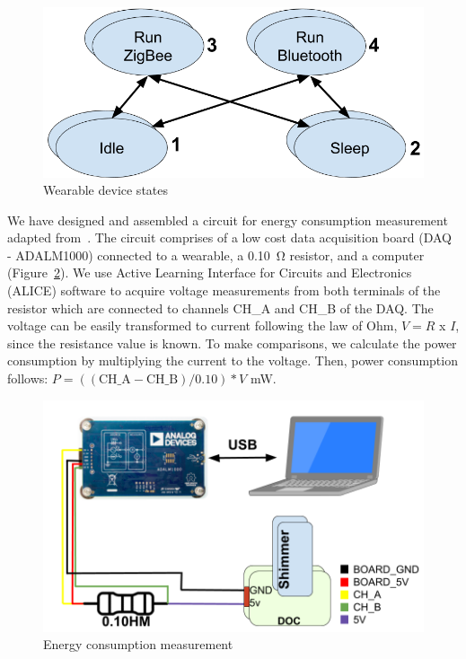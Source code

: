 \documentclass[journal]{IEEEtran}
\begin{document}
\begin{figure}[tbh]
  \centering
  \includegraphics[scale=0.19]{Figures/estados.png}
  \caption{Wearable device states}
  \label{fig:states}
  \vspace{-0.5cm}
\end{figure}

We have designed and assembled a circuit for energy consumption measurement adapted from~\cite{bessa2017jetsonleap}. The circuit comprises of a low cost data acquisition board (DAQ - ADALM1000) connected to a wearable, a 0.10~\si{\ohm} resistor, and a computer (Figure~\ref{fig:circuit}). We use Active Learning Interface for Circuits and Electronics (ALICE) software to acquire voltage measurements from both terminals of the resistor which are connected to channels CH\_A and CH\_B of the DAQ. The voltage can be easily transformed to current following the law of Ohm, $V = R$ x $I$, since the resistance value is known. 
To make comparisons, we calculate the power consumption by multiplying the current to the voltage. Then, power consumption follows: 
$P = ((\mbox{CH\_A} - \mbox{CH\_B}) / 0.10) * V $ mW.

\begin{figure}[!htb]
 \vspace{-0.1cm}
  \centering
  \includegraphics[scale=0.19]{Figures/circuit.png}
  \caption{Energy consumption measurement}
  \label{fig:circuit}
  \vspace{-0.3cm}
\end{figure}
\end{document}
